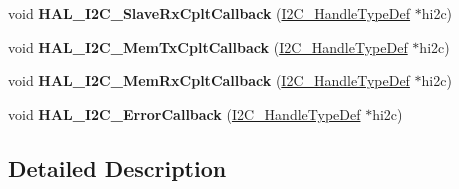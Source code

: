 \begin{DoxyCompactItemize}
\item 
\hypertarget{group___i2_c___i_r_q___handler__and___callbacks_gae23a5b1ce68867c35093ff2b5931e9a0}{void {\bfseries H\-A\-L\-\_\-\-I2\-C\-\_\-\-Slave\-Rx\-Cplt\-Callback} (\hyperlink{struct_i2_c___handle_type_def}{I2\-C\-\_\-\-Handle\-Type\-Def} $\ast$hi2c)}\label{group___i2_c___i_r_q___handler__and___callbacks_gae23a5b1ce68867c35093ff2b5931e9a0}

\item 
\hypertarget{group___i2_c___i_r_q___handler__and___callbacks_ga874f6104d2cdbced9f2ab6e941ec58f0}{void {\bfseries H\-A\-L\-\_\-\-I2\-C\-\_\-\-Mem\-Tx\-Cplt\-Callback} (\hyperlink{struct_i2_c___handle_type_def}{I2\-C\-\_\-\-Handle\-Type\-Def} $\ast$hi2c)}\label{group___i2_c___i_r_q___handler__and___callbacks_ga874f6104d2cdbced9f2ab6e941ec58f0}

\item 
\hypertarget{group___i2_c___i_r_q___handler__and___callbacks_gac16a95413b35f05c5ce725fefd8531a5}{void {\bfseries H\-A\-L\-\_\-\-I2\-C\-\_\-\-Mem\-Rx\-Cplt\-Callback} (\hyperlink{struct_i2_c___handle_type_def}{I2\-C\-\_\-\-Handle\-Type\-Def} $\ast$hi2c)}\label{group___i2_c___i_r_q___handler__and___callbacks_gac16a95413b35f05c5ce725fefd8531a5}

\item 
\hypertarget{group___i2_c___i_r_q___handler__and___callbacks_ga4d5338cd64a656dfdc4154773bc4f05d}{void {\bfseries H\-A\-L\-\_\-\-I2\-C\-\_\-\-Error\-Callback} (\hyperlink{struct_i2_c___handle_type_def}{I2\-C\-\_\-\-Handle\-Type\-Def} $\ast$hi2c)}\label{group___i2_c___i_r_q___handler__and___callbacks_ga4d5338cd64a656dfdc4154773bc4f05d}

\end{DoxyCompactItemize}


\subsection{Detailed Description}
